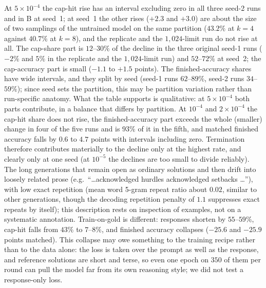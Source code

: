 \documentclass[runningheads]{llncs}
\begin{document}
At $5\times10^{-4}$ the cap-hit rise has an interval excluding zero in all three
seed-2 runs and in B at seed~1; at seed~1 the other rises ($+2.3$ and $+3.0$)
are about the size of two samplings of the untrained model on the same
partition ($43.2\%$ at $k=4$ against $40.7\%$ at $k=8$), and the replicate and
the $1{,}024$-limit run do not rise at all. The cap-share part is $12$--$30\%$
of the decline in the three original seed-1 runs ($-2\%$ and $5\%$ in the
replicate and the $1{,}024$-limit run) and $52$--$72\%$ at seed~2; the
cap-accuracy part is small ($-1.1$ to $+1.5$ points). The finished-accuracy
shares have wide intervals, and they split by seed (seed-1 runs $62$--$89\%$,
seed-2 runs $34$--$59\%$); since seed sets the partition, this may be partition
variation rather than run-specific anatomy. What the table supports is
qualitative: at $5\times10^{-4}$ both parts contribute, in a balance that
differs by partition. At $10^{-4}$ and $2\times10^{-4}$ the cap-hit share does
not rise, the finished-accuracy part exceeds the whole (smaller) change in four
of the five runs and is $93\%$ of it in the fifth, and matched finished accuracy
falls by $0.6$ to $4.7$ points with intervals including zero. Termination
therefore contributes materially to the decline only at the highest rate, and
clearly only at one seed (at $10^{-5}$ the declines are too small to divide
reliably). The long
generations that remain open as ordinary solutions and then drift into loosely
related prose (e.g.\ ``\ldots acknowledged hurdles acknowledged setbacks
\ldots''), with low exact repetition (mean word 5-gram repeat ratio about
$0.02$, similar to other generations, though the decoding repetition penalty of
$1.1$ suppresses exact repeats by itself); this description rests on inspection
of examples, not on a systematic annotation. Train-on-gold is different: responses
shorten by $55$--$59\%$, cap-hit falls from $43\%$ to $7$--$8\%$, and finished
accuracy collapses ($-25.6$ and $-25.9$ points matched). This collapse may owe
something to the training recipe rather than to the data alone: the loss is
taken over the prompt as well as the response, and reference solutions are
short and terse, so even one epoch on $350$ of them per round can pull the model
far from its own reasoning style; we did not test a response-only loss.
\end{document}
